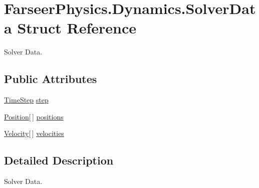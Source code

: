 \hypertarget{struct_farseer_physics_1_1_dynamics_1_1_solver_data}{\section{Farseer\+Physics.\+Dynamics.\+Solver\+Data Struct Reference}
\label{struct_farseer_physics_1_1_dynamics_1_1_solver_data}
}


Solver Data.  


\subsection*{Public Attributes}
\begin{DoxyCompactItemize}
\item 
\hyperlink{struct_farseer_physics_1_1_dynamics_1_1_time_step}{Time\+Step} \hyperlink{struct_farseer_physics_1_1_dynamics_1_1_solver_data_a84e7d275dfac7c45dec8920ab616fd17}{step}
\item 
\hyperlink{struct_farseer_physics_1_1_dynamics_1_1_position}{Position}\mbox{[}$\,$\mbox{]} \hyperlink{struct_farseer_physics_1_1_dynamics_1_1_solver_data_a133bfda7a1f344a88e179c281c94e64a}{positions}
\item 
\hyperlink{struct_farseer_physics_1_1_dynamics_1_1_velocity}{Velocity}\mbox{[}$\,$\mbox{]} \hyperlink{struct_farseer_physics_1_1_dynamics_1_1_solver_data_a11963f8bd5646c0479e7c225112a9cce}{velocities}
\end{DoxyCompactItemize}


\subsection{Detailed Description}
Solver Data. 

